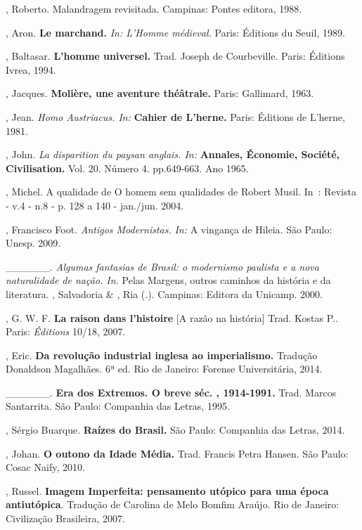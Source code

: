 \begin{Parskip}
, Roberto. Malandragem revisitada. Campinas: Pontes editora, 1988.

, Aron. \textbf{Le marchand.} \emph{In: L'Homme médieval.}
Paris: Éditions du Seuil, 1989.

, Baltasar. \textbf{L'homme universel.} Trad. Joseph de
Courbeville. Paris: Éditions Ivrea, 1994.

, Jacques. \textbf{Molière, une aventure théâtrale.} Paris:
Gallimard, 1963.

, Jean. \emph{Homo Austriacus. In:} \textbf{Cahier de L'herne.}
Paris: Éditions de L'herne, 1981.

, John. \emph{La disparition du paysan anglais. In:}
\textbf{Annales, Économie, Société, Civilisation.} Vol. 20. Número 4.
pp.649-663. Ano 1965.

, Michel. A qualidade de O homem sem qualidades de Robert Musil.
In~: Revista  - v.4 - n.8 - p. 128 a 140 - jan./jun. 2004.

, Francisco Foot. \emph{Antigos Modernistas.} \emph{In:} A
vingança de Hileia. São Paulo: Unesp. 2009.

\_\_\_\_\_\_. \emph{Algumas fantasias de Brasil: o modernismo paulista e
a nova naturalidade de nação. In.} Pelas Margens, outros caminhos da
história e da literatura. , Salvadoria \& , Ria (.).
Campinas: Editora da Unicamp. 2000.

, G. W. F. \textbf{La raison dans l'histoire} [A razão na
história] Trad. Kostas P.. Paris: \emph{Éditions} 10/18, 2007.

, Eric. \textbf{Da revolução industrial inglesa ao
imperialismo.} Tradução Donaldson Magalhães. 6ª ed. Rio de Janeiro:
Forense Universitária, 2014.

\_\_\_\_\_\_. \textbf{Era dos Extremos. O breve séc. , 1914-1991.}
Trad. Marcos Santarrita. São Paulo: Companhia das Letras, 1995.

, Sérgio Buarque. \textbf{Raízes do Brasil.} São Paulo: Companhia
das Letras, 2014.

, Johan. \textbf{O outono da Idade Média.} Trad. Francis Petra
Hansen. São Paulo: Cosac Naify, 2010.

, Russel. \textbf{Imagem Imperfeita: pensamento utópico para uma
época antiutópica}. Tradução de Carolina de Melo Bomfim Araújo.
Rio de Janeiro: Civilização Brasileira, 2007.


\end{Parskip}
